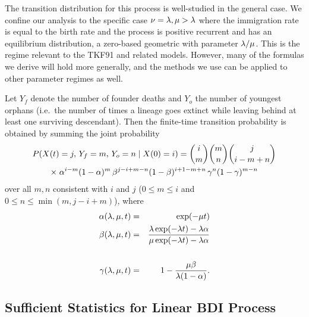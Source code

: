 The transition distribution for this process is well-studied in the general case.
We confine our analysis to the specific case $\nu = \lambda, \mu > \lambda$
where the immigration rate is equal to the birth rate
and the process is positive recurrent and has an equilibrium distribution,
a zero-based geometric with parameter $\lambda/\mu$.
This is the regime relevant to the TKF91 and related models.
However, many of the formulas we derive will hold more generally, and the methods we use can be applied to other parameter regimes as well.

Let $Y_f$ denote the number of founder deaths
and $Y_o$ the number of youngest orphans (i.e.\ the number of times a lineage goes extinct while leaving behind at least one surviving descendant).
Then the finite-time transition probability is obtained by summing the joint probability
\begin{multline*}
P(X(t) = j,\, Y_f = m,\, Y_o = n \mid X(0) = i) =
\binom{i}{m} \binom{m}{n} \binom{j}{i-m+n} \\
\times\; \alpha^{i-m} (1-\alpha)^m \, \beta^{j-i+m-n} (1-\beta)^{i+1-m+n} \, \gamma^n (1-\gamma)^{m-n}
\end{multline*}
over all $m,n$ consistent with $i$ and $j$ ($0 \leq m \leq i$ and $0 \leq n \leq \min(m, j-i+m)$),
where
\begin{eqnarray}
    \alpha(\lambda,\mu,t) & = &
        \exp (-\mu t) \label{tkf:alpha} \\
    \beta(\lambda,\mu,t) & = &
        \frac{\lambda \exp (-\lambda t) - \lambda \alpha}
        {\mu \exp (-\lambda t) - \lambda \alpha} \label{tkf:beta} \\
    \\
    \gamma(\lambda,\mu,t) & = &
        1 - \frac{\mu \beta}{\lambda (1- \alpha)}. \label{tkf:gamma}
\end{eqnarray}


\subsection{Sufficient Statistics for Linear BDI Process}

